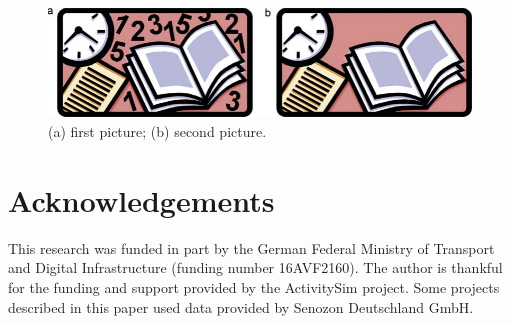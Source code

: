 \documentclass[3p,times,procedia]{elsarticle}
\begin{document}


\begin{figure}[t]\vspace*{4pt}
\centerline{\includegraphics{gr1}}
\caption{(a) first picture; (b) second picture.}
\end{figure}


\section{Acknowledgements}

This research was funded in part by the German Federal Ministry of Transport and Digital Infrastructure (funding number 16AVF2160). The author is thankful for the funding and support provided by the ActivitySim project. Some projects described in this paper used data provided by Senozon Deutschland GmbH.



\end{document}
